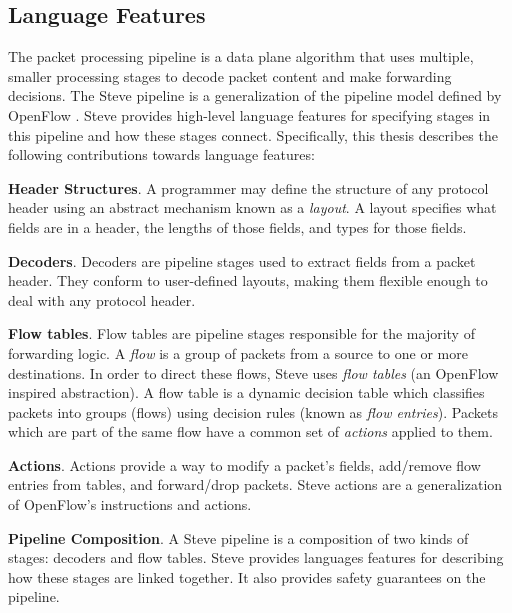\subsection{Language Features}

The packet processing pipeline is a data plane algorithm that
uses multiple, smaller processing stages to decode packet content and make
forwarding decisions.
The Steve pipeline is a generalization
of the pipeline model defined by OpenFlow \cite{openflow_spec}.
Steve provides high-level language features for specifying
stages in this pipeline and how these stages connect.
Specifically, this thesis describes the following contributions towards language features:

\textbf{Header Structures}.
A programmer may define the structure of any protocol header using an abstract
mechanism known as a \emph{layout}.
A layout specifies what fields are in a header, the lengths of those fields,
and types for those fields.

\textbf{Decoders}. Decoders are pipeline stages used to extract
fields from a packet header.
They conform to user-defined layouts, making them flexible enough
to deal with any protocol header.

%

\textbf{Flow tables}.
Flow tables are pipeline stages responsible for the majority of forwarding logic.
A \emph{flow} is a group of packets from a source to one
or more  destinations. In order to direct these flows, Steve uses \emph{flow tables} (an OpenFlow inspired abstraction).
A flow table is a dynamic
decision table which classifies packets into groups (flows) using
decision rules (known as \emph{flow entries}).
Packets which are part of the same flow have a common set of \emph{actions}
applied to them.

\textbf{Actions}. Actions provide a way to modify a packet's fields, add/remove
flow entries from tables, and forward/drop packets. Steve actions are a
generalization
of OpenFlow's instructions and actions.

\textbf{Pipeline Composition}. A Steve pipeline is a composition of two kinds of
stages: decoders and flow tables.
Steve provides languages features for describing how these stages are linked
together. It also provides safety guarantees on the pipeline.

